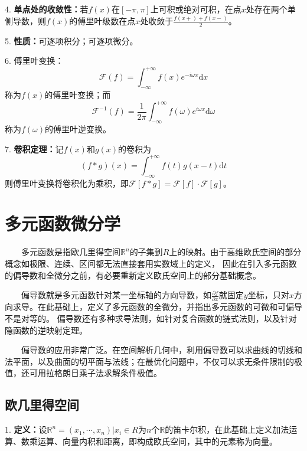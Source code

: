 4. \textbf{单点处的收敛性：}若$f(x)$在$[-\pi,\pi]$上可积或绝对可积，在点$x$处存在两个单侧导数，则$f(x)$的傅里叶级数在点$x$处收敛于$\frac{f(x+)+f(x-)}{2}$。

5. \textbf{性质：}可逐项积分；可逐项微分。

6. 傅里叶变换：
\begin{equation*}
    \mathscr{F}(f)=\int_{-\infty}^{+\infty}f(x)e^{-i\omega x}\mathrm{d}x
\end{equation*}
称为$f(x)$的傅里叶变换；而
\begin{equation*}
    \mathscr{F}^{-1}(f)=\frac{1}{2\pi}\int_{-\infty}^{+\infty}f(\omega)e^{i\omega x}\mathrm{d}\omega
\end{equation*}
称为$f(\omega)$的傅里叶逆变换。

7. \textbf{卷积定理：}记$f(x)$和$g(x)$的卷积为
\begin{equation*}
    (f*g)(x)=\int_{-\infty}^{+\infty} f(t)g(x-t)\mathrm{d}t
\end{equation*}
则傅里叶变换将卷积化为乘积，即$\mathscr{F}[f*g]=\mathscr{F}[f]\cdot \mathscr{F}[g]$。

\section{多元函数微分学}

\begin{tcolorbox}[colback=red!5,colframe=red!75!black]
    ~~~~多元函数是指欧几里得空间$\mathbb{R}^n$的子集到$R$上的映射。由于高维欧氏空间的部分概念如极限、连续、区间都无法直接套用实数域上的定义，
    因此在引入多元函数的偏导数和全微分之前，有必要重新定义欧氏空间上的部分基础概念。

    ~~~~偏导数就是多元函数针对某一坐标轴的方向导数，如$\frac{\partial f}{\partial x}$就固定$y$坐标，只对$x$方向求导。在此基础上，定义了多元函数的全微分，并指出多元函数的可微和可偏导不是对等的。
    偏导数还有多种求导法则，如针对复合函数的链式法则，以及针对隐函数的逆映射定理。

    ~~~~偏导数的应用非常广泛。在空间解析几何中，利用偏导数可以求曲线的切线和法平面，以及曲面的切平面与法线；在最优化问题中，不仅可以求无条件限制的极值，还可用拉格朗日乘子法求解条件极值。
\end{tcolorbox}

\subsection{欧几里得空间}

1. \textbf{定义：}设$\mathbb{R}^n={(x_1,\cdots,x_n)|x_i\in R}$为$n$个$\mathbb{R}$的笛卡尔积，在此基础上定义加法运算、数乘运算、向量内积和距离，即构成欧氏空间，其中的元素称为向量。

